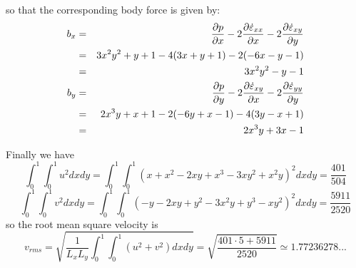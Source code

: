 so that the corresponding body force is given by:
\begin{eqnarray}
b_x 
&=& \frac{\partial p}{\partial x}  
-2\frac{\partial \dot{\varepsilon}_{xx}}{\partial x} -  2\frac{\partial \dot{\varepsilon}_{xy}}{\partial y} \nonumber\\
&=& 3x^2y^2 + y +1  - 4(3x+y+1) - 2(-6x-y-1) \nonumber\\
&=& 3x^2y^2 -y-1   \\
b_y 
&=& \frac{\partial p}{\partial y} 
-2 \frac{\partial \dot{\varepsilon}_{xy}}{\partial x} - 2\frac{\partial \dot{\varepsilon}_{yy}}{\partial y}  \nonumber\\
&=& 2x^3y+x+1  -2(-6y+x-1) - 4(3y-x+1) \nonumber\\
&=& 2x^3y+3x-1 
\end{eqnarray}

Finally we have
\[
\int_0^1 \int_0^1 u^2 dxdy=
\int_0^1 \int_0^1 ( x+x^2 - 2xy+x^3 - 3xy^2 + x^2y  )^2 dx dy = \frac{401}{504} 
\]
\[
\int_0^1 \int_0^1 v^2 dxdy=
\int_0^1 \int_0^1 (-y-2xy+y^2 -3x^2y + y^3 - xy^2  )^2 dx dy = \frac{5911}{2520}
\]
so the root mean square velocity is
\[
v_{rms} = \sqrt{ \frac{1}{L_x L_y}  \int_0^1 \int_0^1 (u^2+v^2) dx dy }  
= \sqrt{\frac{401\cdot 5 + 5911}{2520}}\simeq 1.77236278... 
\]


